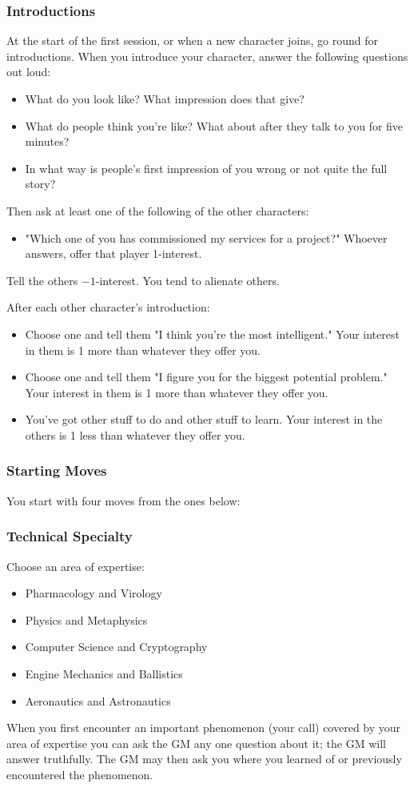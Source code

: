 \subsubsection{Introductions}
At the start of the first session, or when a new character joins, go round for introductions.
When you introduce your character, answer the following questions out loud:
\begin{itemize}
\item What do you look like? What impression does that give?
\item What do people think you're like? What about after they talk to you for five minutes?
\item In what way is people's first impression of you wrong or not quite the full story?
\end{itemize}

Then ask at least one of the following of the other characters:
\begin{itemize}
\item "Which one of you has commissioned my services for a project?" Whoever answers, offer that player 1-interest.
\end{itemize}
Tell the others $-1$-interest. You tend to alienate others.

After each other character's introduction:
\begin{itemize}
\item Choose one and tell them "I think you're the most intelligent." Your interest in them is 1 more than whatever they offer you.
\item Choose one and tell them "I figure you for the biggest potential problem." Your interest in them is 1 more than whatever they offer you.
\item You’ve got other stuff to do and other stuff to learn. Your interest in the others is 1 less than whatever they offer you.
\end{itemize}

\subsubsection{Starting Moves}
You start with four moves from the ones below:

\subsubsection{Technical Specialty}\label{sec:Technical Specialty}
Choose an area of expertise:
\begin{itemize}
\item Pharmacology and Virology
\item Physics and Metaphysics
\item Computer Science and Cryptography
\item Engine Mechanics and Ballistics
\item Aeronautics and Astronautics
\end{itemize}
When you first encounter an important phenomenon (your call) covered by your area of expertise you can ask the GM any one question about it; the GM will answer truthfully. The GM may then ask you where you learned of or previously encountered the phenomenon.

